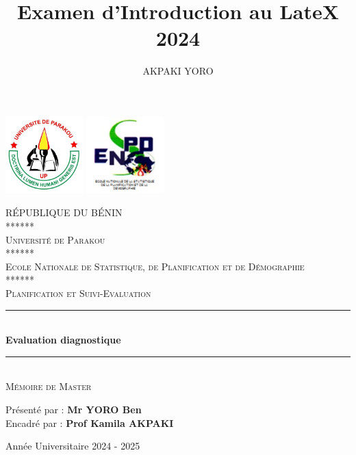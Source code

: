 \documentclass[10pt,a4paper]{article}
\author{AKPAKI YORO}
\title{Examen d'Introduction au LateX 2024}
\begin{document}
\begin{titlepage}
       \centering
    
    \includegraphics[width=3cm]{UP.jpg} \hspace{9cm}    \includegraphics[width=3cm]{ENSPD.jpg}
     
   \textsc{\LARGE RÉPUBLIQUE DU BÉNIN} \\[0.2cm]
    ****** \\[0.2cm]
    \textsc{\LARGE Université de Parakou}\\[0.5cm]
    ****** \\[0.2cm]
    \textsc{\Large Ecole Nationale de Statistique, de Planification et de Démographie}\\[0.5cm]
    ****** \\[0.2cm]
    \textsc{\large Planification et Suivi-Evaluation}\\[2cm]
    
    \rule{\linewidth}{0.5mm} \\[0.4cm]
    {\huge \bfseries Evaluation diagnostique}\\[0.4cm]
    \rule{\linewidth}{0.5mm} \\[1.5cm]
    
    \textsc{\Large Mémoire de Master }\\[1cm]
    
    \begin{flushleft} \large
        Présenté par : \textbf{Mr YORO Ben}\\[1cm]
        Encadré par : \textbf{Prof Kamila AKPAKI }\\[2cm]
    \end{flushleft}
    
    \vfill
    
    {\large Année Universitaire 2024 - 2025}

\end{titlepage}
\end{document}
